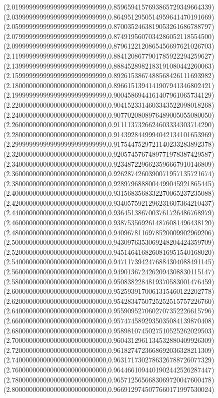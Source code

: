 \documentclass[11pt]{report}
\begin{document}
\begin{center}
  (2.019999999999999999999999999,0.8596594157693865729349664339)
  (2.039999999999999999999999999,0.8649512950514959641470191669)
  (2.059999999999999999999999999,0.8700352463819053261686788797)
  (2.079999999999999999999999999,0.8749195607034286052118554500)
  (2.099999999999999999999999999,0.8796122120865456697621026703)
  (2.119999999999999999999999999,0.8841208677901785922294259627)
  (2.139999999999999999999999999,0.8884528982183191080442260063)
  (2.159999999999999999999999999,0.8926153867488568426111693982)
  (2.180000000000000000000000000,0.8966151394141907941346802421)
  (2.199999999999999999999999999,0.9004586944161407961065734129)
  (2.220000000000000000000000000,0.9041523314603343522098018268)
  (2.240000000000000000000000000,0.9077020808976489005055080050)
  (2.260000000000000000000000000,0.9111137326624603334303714290)
  (2.280000000000000000000000000,0.9143928449994042134101653969)
  (2.299999999999999999999999999,0.9175447529721140233283892378)
  (2.320000000000000000000000000,0.9205745767489771978387429587)
  (2.340000000000000000000000000,0.9234872296623596667910146809)
  (2.360000000000000000000000000,0.9262874260390071957135721674)
  (2.380000000000000000000000000,0.9289796888004499045921865445)
  (2.400000000000000000000000000,0.9315683568332270065237235088)
  (2.420000000000000000000000000,0.9340575921296231607364210437)
  (2.440000000000000000000000000,0.9364513867003761726486768979)
  (2.460000000000000000000000000,0.9387535692614876081496438120)
  (2.480000000000000000000000000,0.9409678116978520009902969206)
  (2.500000000000000000000000000,0.9430976353069248204424359709)
  (2.520000000000000000000000000,0.9451464168260816951540168020)
  (2.540000000000000000000000000,0.9471173942476884304088491145)
  (2.560000000000000000000000000,0.9490136724262094308830115147)
  (2.580000000000000000000000000,0.9508382284819370583001476459)
  (2.600000000000000000000000000,0.9525939170061315460122202778)
  (2.620000000000000000000000000,0.9542834750725252515757226760)
  (2.640000000000000000000000000,0.9559095270602707352226615796)
  (2.660000000000000000000000000,0.9574745892935035084139870408)
  (2.680000000000000000000000000,0.9589810745027510525262029503)
  (2.700000000000000000000000000,0.9604312961134532880409926309)
  (2.720000000000000000000000000,0.9618274723668692036328211309)
  (2.740000000000000000000000000,0.9631717302786326788726077329)
  (2.760000000000000000000000000,0.9644661094401902442526287447)
  (2.780000000000000000000000000,0.9657125656683069720047600478)
  (2.800000000000000000000000000,0.9669129745077660171997530024)

\end{center}
\end{document}
